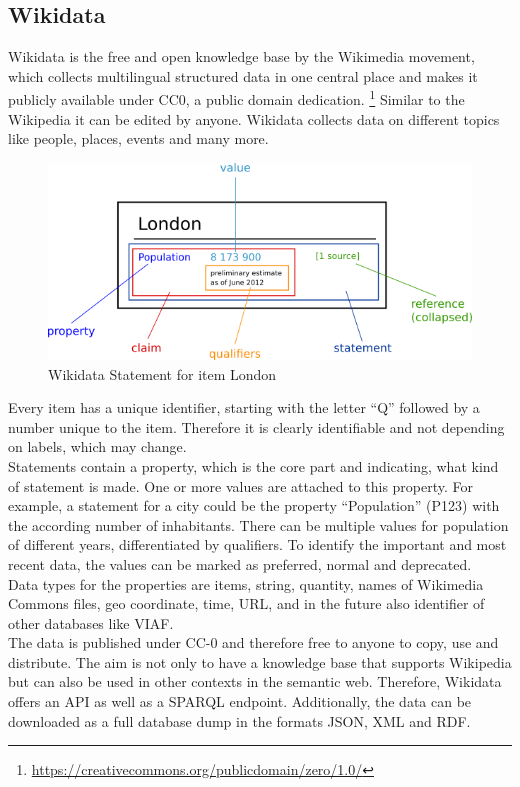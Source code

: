 \subsection{Wikidata}

Wikidata is the free and open knowledge base by the Wikimedia movement, which collects multilingual structured data in one central place and makes it publicly available under CC0, a public domain dedication. \footnote{\href{https://creativecommons.org/publicdomain/zero/1.0/}{https://creativecommons.org/publicdomain/zero/1.0/}} Similar to the Wikipedia it can be edited by anyone. Wikidata collects data on different topics like people, places, events and many more.
\begin{figure}[ht]
	\centering
	\includegraphics[width=120mm]{diagrams/Wikidata_statement.png}
	\caption{Wikidata Statement for item London}
	\label{fig1}
\end{figure}

Every item has a unique identifier, starting with the letter ``Q'' followed by a number unique to the item. Therefore it is clearly identifiable and not depending on labels, which may change. \\
Statements contain a property, which is the core part and indicating, what kind of statement is made. One or more values are attached to this property. For example, a statement for a city could be the property ``Population'' (P123)  with the according number of inhabitants. There can be multiple values for population of different years, differentiated by qualifiers. To identify the important and most recent data, the values can be marked as preferred, normal and deprecated.\\
Data types for the properties  are items, string, quantity, names of Wikimedia Commons files, geo coordinate, time, URL,  and in the future also identifier of other databases like VIAF. \\
The data is published under CC-0 and therefore free to anyone to copy, use and distribute.
The aim is not only to have a knowledge base that supports Wikipedia but can also be used in other contexts in the semantic web. Therefore, Wikidata offers an API as well as a SPARQL endpoint. Additionally, the data can be downloaded as a full database dump in the formats JSON, XML and RDF.  